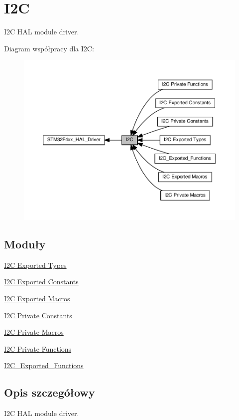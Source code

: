 \hypertarget{group___i2_c}{}\section{I2C}
\label{group___i2_c}


I2C H\+AL module driver.  


Diagram współpracy dla I2C\+:\nopagebreak
\begin{figure}[H]
\begin{center}
\leavevmode
\includegraphics[width=350pt]{group___i2_c}
\end{center}
\end{figure}
\subsection*{Moduły}
\begin{DoxyCompactItemize}
\item 
\hyperlink{group___i2_c___exported___types}{I2\+C Exported Types}
\item 
\hyperlink{group___i2_c___exported___constants}{I2\+C Exported Constants}
\item 
\hyperlink{group___i2_c___exported___macros}{I2\+C Exported Macros}
\item 
\hyperlink{group___i2_c___private___constants}{I2\+C Private Constants}
\item 
\hyperlink{group___i2_c___private___macros}{I2\+C Private Macros}
\item 
\hyperlink{group___i2_c___private___functions}{I2\+C Private Functions}
\item 
\hyperlink{group___i2_c___exported___functions}{I2\+C\+\_\+\+Exported\+\_\+\+Functions}
\end{DoxyCompactItemize}


\subsection{Opis szczegółowy}
I2C H\+AL module driver. 

